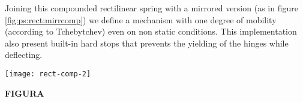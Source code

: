 		Joining this compounded rectilinear spring with a mirrored version (as in figure \ref{fig:ps:rect:mirrcomp}) we define a mechanism with one degree of mobility (according to Tchebytchev) even on non static conditions. This implementation also present built-in hard stops that prevents the yielding of the hinges while deflecting.
		
		\begin{SCfigure}[2][bht]
			\centering
			\texttt{[image: rect-comp-2]}
			\caption{improved compound rectilinear spring from the version in figure \ref{fig:ps:rect:comp} with mobility $M=1$ obtained by joining the original piece with a mirrored copy. The red circles shown the hard stop of motion realized by the frame in order to avoid yielding.}
			\label{fig:ps:rect:mirrcomp}
		\end{SCfigure}
	
		\textbf{FIGURA}
	
	
	
	
	
	
	
	
	
	
	
	
	
	
	
	
	
	
	
	
	
	